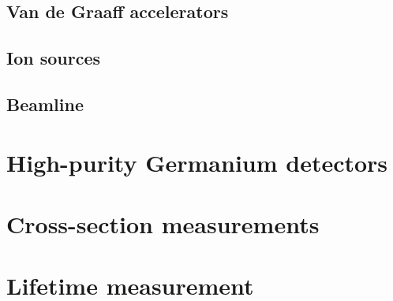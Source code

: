 \subsection{Van de Graaff accelerators}

\subsection{Ion sources}

\subsection{Beamline}



\section{High-purity Germanium detectors}
\label{sec: HPGe detectors}


\section{Cross-section measurements}
\label{sec: nsl experiment}


\section{Lifetime measurement}
\label{sec: caspar experiment}




%
% 
% 
